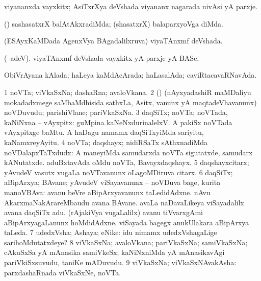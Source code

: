 \bentry
{} 
\gl{\nA}
\bmng
 viyananxda vayxkitx; AsiTxrXya deVshada viyananx nagarada nivAsi yA parxje. 
\emng
\eentry

\bentry
{} 
\gl{\kirxvi}
\expl{\Latin }
\bmng
 (\nAyxshA) sashasatxrX balAtAkxradiMda; (shasatxrX) balaparxyoVga diMda. 
\emng
\eentry

\bentry
{} 
\gl{\gu}
\expl{}
\bmng
 (ESAyxKaMDada AgenxVya BAgadalilxruva) viyaTAnxmf deVshada. 
\emng
\eentry

\bentry
{} 
\gl{\nA}
\expl{}
\bmng
(\bava\ adeV). viyaTAnxmf deVshada vayxkitx yA parxje yA BASe. 
\emng
\eentry

\bentry
{} 
\gl{\gu}
\expl{\F}
\bmng
 ObiVrAyana kAlada; haLeya kaMdAcArada; haLasalAda; caviRtacavaRNavAda. 
\emng
\eentry

\bentry
{} 
\gl{\nA}
\expl{}
\bmng
\bnum
\num{1} noVTa; viVkaSxNa; dashaRna; avaloVkana. 
\num{2} (\nAyxshA) (nAyxyadashiR maMDaliyu mokadadxmege saMbaMdhisida sathxLa, Asitx, \mo vanunx yA maqtadeVhavanunx) noVDuvudu; parishiVlane; pariVkaSxNa. 
\num{3} daqSiTx; noVTa; noVTada, kaNiNxna -- vAyxpitx:  guMpina kaNeNxdurinalelxV.  A pakiSx noVTada vAyxpitxge baMtu.  A haDagu namamx daqSiTxyiMda sariyitu, kaNamxreyAyitu. 
\num{4} noVTa; daqshayx; nidiRSaTx sAthxnadiMda noVDalapxTaTxdudx:  A maneyiMda samudarxda noVTa sigutatxde, samudarx kANutatxde.  aduBxtavAda oMdu noVTa, Bavayxdaqshayx. 
\num{5} daqshayxcitarx; yAvudeV vasutx \mo vugaLa noVTavanunx oLagoMDiruva citarx. 
\num{6} daqSiTx; aBipArxya; BAvane; yAvudeV viSayavanunx -- noVDuva bage, kurita manoVBAva:  avanu beVre aBipArxyavanunx taLedidAdxne.  nAvu AkarxmaNakArareMbaudu avana BAvane.  avaLa naDavaLikeya viSayadalilx avana daqSiTx adu.  (rAjakiVya \mo vugaLalilx) avanu tiVvarxgAmi aBipArxyagaLanunx hoMdidAdxne.  viSayada bagegx anukUlakara aBipArxya taLeda. 
\num{7} udedxVsha; Ashaya; eNike:  idu nimamx udedxVshagaLige sarihoMdutatxdeye? 
\num{8} viVkaSxNa; avaloVkana; pariVkaSxNa; samiVkaSxNa; cAkuSxSa yA mAnasika samiVkeSx; kaNiNxniMda yA mAnasikavAgi pariVkiSxsuvudu, taniKe mADuvudu. 
\num{9} viVkaSxNa; viVkaSxNAvakAsha:  parxdashaRnada viVkaSxNe, noVTa. 
\enum
\emng

